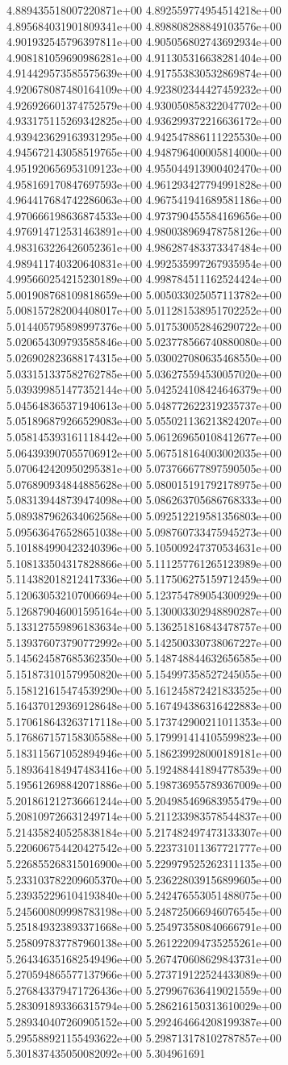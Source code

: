 4.889435518007220871e+00	4.892559774954514218e+00	4.895684031901809341e+00	4.898808288849103576e+00	4.901932545796397811e+00	4.905056802743692934e+00	4.908181059690986281e+00	4.911305316638281404e+00	4.914429573585575639e+00	4.917553830532869874e+00	4.920678087480164109e+00	4.923802344427459232e+00	4.926926601374752579e+00	4.930050858322047702e+00	4.933175115269342825e+00	4.936299372216636172e+00	4.939423629163931295e+00	4.942547886111225530e+00	4.945672143058519765e+00	4.948796400005814000e+00	4.951920656953109123e+00	4.955044913900402470e+00	4.958169170847697593e+00	4.961293427794991828e+00	4.964417684742286063e+00	4.967541941689581186e+00	4.970666198636874533e+00	4.973790455584169656e+00	4.976914712531463891e+00	4.980038969478758126e+00	4.983163226426052361e+00	4.986287483373347484e+00	4.989411740320640831e+00	4.992535997267935954e+00	4.995660254215230189e+00	4.998784511162524424e+00	5.001908768109818659e+00	5.005033025057113782e+00	5.008157282004408017e+00	5.011281538951702252e+00	5.014405795898997376e+00	5.017530052846290722e+00	5.020654309793585846e+00	5.023778566740880080e+00	5.026902823688174315e+00	5.030027080635468550e+00	5.033151337582762785e+00	5.036275594530057020e+00	5.039399851477352144e+00	5.042524108424646379e+00	5.045648365371940613e+00	5.048772622319235737e+00	5.051896879266529083e+00	5.055021136213824207e+00	5.058145393161118442e+00	5.061269650108412677e+00	5.064393907055706912e+00	5.067518164003002035e+00	5.070642420950295381e+00	5.073766677897590505e+00	5.076890934844885628e+00	5.080015191792178975e+00	5.083139448739474098e+00	5.086263705686768333e+00	5.089387962634062568e+00	5.092512219581356803e+00	5.095636476528651038e+00	5.098760733475945273e+00	5.101884990423240396e+00	5.105009247370534631e+00	5.108133504317828866e+00	5.111257761265123989e+00	5.114382018212417336e+00	5.117506275159712459e+00	5.120630532107006694e+00	5.123754789054300929e+00	5.126879046001595164e+00	5.130003302948890287e+00	5.133127559896183634e+00	5.136251816843478757e+00	5.139376073790772992e+00	5.142500330738067227e+00	5.145624587685362350e+00	5.148748844632656585e+00	5.151873101579950820e+00	5.154997358527245055e+00	5.158121615474539290e+00	5.161245872421833525e+00	5.164370129369128648e+00	5.167494386316422883e+00	5.170618643263717118e+00	5.173742900211011353e+00	5.176867157158305588e+00	5.179991414105599823e+00	5.183115671052894946e+00	5.186239928000189181e+00	5.189364184947483416e+00	5.192488441894778539e+00	5.195612698842071886e+00	5.198736955789367009e+00	5.201861212736661244e+00	5.204985469683955479e+00	5.208109726631249714e+00	5.211233983578544837e+00	5.214358240525838184e+00	5.217482497473133307e+00	5.220606754420427542e+00	5.223731011367721777e+00	5.226855268315016900e+00	5.229979525262311135e+00	5.233103782209605370e+00	5.236228039156899605e+00	5.239352296104193840e+00	5.242476553051488075e+00	5.245600809998783198e+00	5.248725066946076545e+00	5.251849323893371668e+00	5.254973580840666791e+00	5.258097837787960138e+00	5.261222094735255261e+00	5.264346351682549496e+00	5.267470608629843731e+00	5.270594865577137966e+00	5.273719122524433089e+00	5.276843379471726436e+00	5.279967636419021559e+00	5.283091893366315794e+00	5.286216150313610029e+00	5.289340407260905152e+00	5.292464664208199387e+00	5.295588921155493622e+00	5.298713178102787857e+00	5.301837435050082092e+00	5.304961691